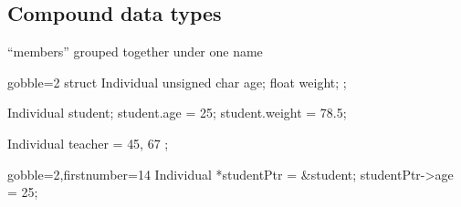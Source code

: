 \subsection[Compound]{Compound data types}

\begin{frame}[fragile]
  \begin{mdframed}[style=simplebox]
    \center ``members'' grouped together under one name
  \end{mdframed}
  \begin{multicols}{2}
    \begin{cppcode*}{gobble=2}
      struct Individual {
        unsigned char age;
        float weight;
      };

      Individual student;
      student.age = 25;
      student.weight = 78.5;

      Individual teacher = {
        45, 67
      };
    \end{cppcode*}
    \columnbreak
    \begin{cppcode*}{gobble=2,firstnumber=14}
      Individual *studentPtr =
        &student;
      studentPtr->age = 25;
    \end{cppcode*}
    \pause
    \vfill
    \hspace{-1.5cm}
    \vfill \null
  \end{multicols}
\end{frame}


